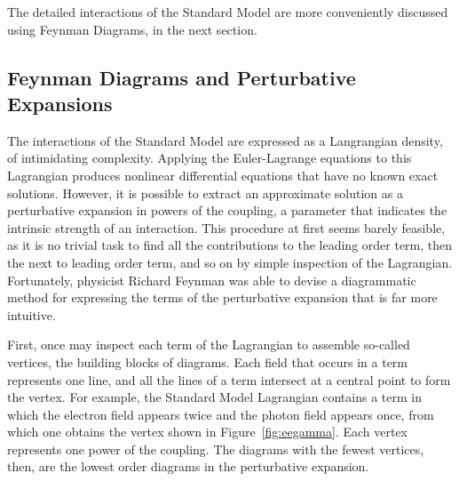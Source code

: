   The detailed interactions of the Standard Model are more conveniently discussed using Feynman Diagrams, in the next section.

  \subsection{Feynman Diagrams and Perturbative Expansions} \label{sec:feyndiags}

  The interactions of the Standard Model are expressed as a Langrangian density, of intimidating complexity.
  Applying the Euler-Lagrange equations to this Lagrangian produces nonlinear differential equations that have no known exact solutions.
  However, it is possible to extract an approximate solution as a perturbative expansion in powers of the coupling, a parameter that indicates the intrinsic strength of an interaction.
  This procedure at first seems barely feasible, as it is no trivial task to find all the contributions to the leading order term, then the next to leading order term, and so on by simple inspection of the Lagrangian.
  Fortunately, physicist Richard Feynman was able to devise a diagrammatic method for expressing the terms of the perturbative expansion that is far more intuitive.

  First, once may inspect each term of the Lagrangian to assemble so-called vertices, the building blocks of diagrams.
  Each field that occurs in a term represents one line, and all the lines of a term intersect at a central point to form the vertex.
  For example, the Standard Model Lagrangian contains a term in which the electron field appears twice and the photon field appears once, from which one obtains the vertex shown in Figure~\ref{fig:eegamma}.
  Each vertex represents one power of the coupling.
  The diagrams with the fewest vertices, then, are the lowest order diagrams in the perturbative expansion.

